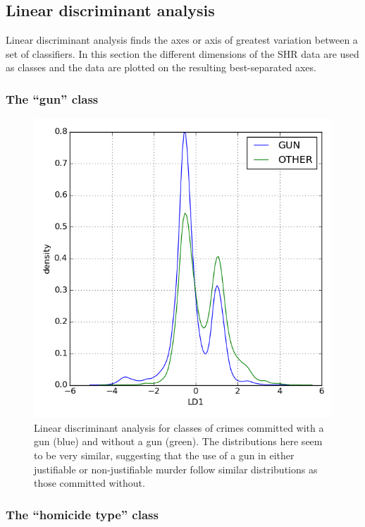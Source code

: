 \documentclass{evanarticle}
\begin{document}
\subsection{Linear discriminant analysis} \label{sec_lda}

Linear discriminant analysis finds the axes or axis of greatest variation between a set of classifiers.
In this section the different dimensions of the SHR data are used as classes and the data are plotted on the resulting best-separated axes.

\subsubsection{The ``gun'' class} \label{sec_gun_class}

\begin{figure}[H]
  \centering
    \includegraphics[width=\linewidth]{images/gun/gun.png}
  \caption{Linear discriminant analysis for classes of crimes committed with a gun (blue) and without a gun (green).  The distributions here seem to be very similar, suggesting that the use of a gun in either justifiable or non-justifiable murder follow similar distributions as those committed without.}
  \label{fig_gun}
\end{figure}

\subsubsection{The ``homicide type'' class} \label{sec_homicide_class}
\end{document}
